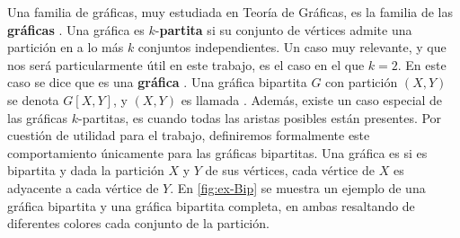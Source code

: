 Una familia de gr\'aficas, muy estudiada en Teor\'ia de Gr\'aficas, es la
familia de las \textbf{gr\'aficas }. Una
gr\'afica es $k$-\textbf{partita} si su conjunto de v\'ertices admite una
partici\'on en a lo m\'as $k$ conjuntos independientes. Un caso muy relevante, y
que nos ser\'a particularmente \'util en este trabajo, es el caso en el que
$k=2$. En este caso se dice que es una \textbf{gr\'afica}
. Una gr\'afica
bipartita $G$ con partici\'on $(X,Y)$ se denota $G[X,Y]$, y $(X,Y)$ es llamada
. Adem\'as, existe un caso especial de las gr\'aficas
$k$-partitas, es cuando todas las aristas posibles est\'an presentes. Por
cuesti\'on de utilidad para el trabajo, definiremos formalmente este
comportamiento \'unicamente para las gr\'aficas bipartitas. Una gr\'afica es
 si es
bipartita y dada la partici\'on $X$ y $Y$ de sus v\'ertices, cada v\'ertice de
$X$ es adyacente a cada v\'ertice de $Y$. En \cref{fig:ex-Bip} se muestra un
ejemplo de una gr\'afica bipartita y una gr\'afica bipartita completa, en ambas
resaltando de diferentes colores cada conjunto de la partici\'on. 

